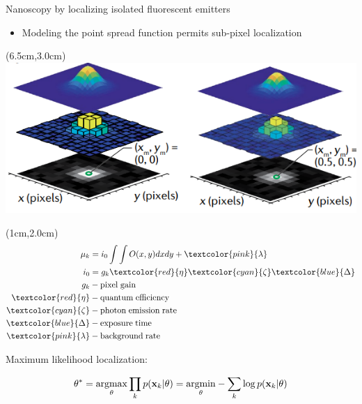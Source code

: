 \documentclass{beamer}					%
\begin{document}
\begin{frame}{Nanoscopy by localizing isolated fluorescent emitters}
\begin{itemize}
\item Modeling the point spread function permits sub-pixel localization 
\end{itemize}
\begin{textblock*}{8cm}(6.5cm,3.0cm)
\includegraphics[width=\textwidth]{../../phd/dissertation/dissertation/media/Model.png}
\end{textblock*}

\begin{textblock*}{2cm}(1cm,2.0cm)
\begin{align*}
\mu_{k} &= i_{0}\int\int O(x,y)dxdy + \textcolor{pink}{\lambda}\\
i_{0} &= g_{k}\textcolor{red}{\eta} \textcolor{cyan}{\zeta}\textcolor{blue}{\Delta} 
\\
g_{k} &- \mathrm{pixel\; gain}\\
\textcolor{red}{\eta} &- \mathrm{quantum\; efficiency}\\
\textcolor{cyan}{\zeta} &- \mathrm{photon\; emission\; rate}\\
\textcolor{blue}{\Delta} &- \mathrm{exposure\; time}\\
\textcolor{pink}{\lambda} &- \mathrm{background \; rate}
\end{align*}
\end{textblock*}

\vspace{2in}

Maximum likelihood localization:

\begin{equation*}
\theta^{*} = \underset{\theta}{\mathrm{argmax}}\prod_{k}p(\bold{x}_{k}|\theta)= \underset{\theta}{\mathrm{argmin}}-\sum_{k}\log p(\bold{x}_{k}|\theta)
\end{equation*}

\end{frame}
\end{document}
